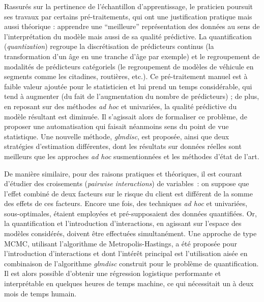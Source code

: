 Rassurés sur la pertinence de l'échantillon d'apprentissage, le praticien poursuit ses travaux par certains pré-traitements, qui ont une justification pratique mais aussi théorique : apprendre une ``meilleure'' représentation des données au sens de l'interprétation du modèle mais aussi de sa qualité prédictive. La quantification (\textit{quantization}) regroupe la discrétisation de prédicteurs continus (la transformation d'un âge en une tranche d'âge par exemple) et le regroupement de modalités de prédicteurs catégoriels (le regroupement de modèles de véhicule en segments comme les citadines, routières, etc.). Ce pré-traitement manuel est à faible valeur ajoutée pour le statisticien et lui prend un temps considérable, qui tend à augmenter (du fait de l'augmentation du nombre de prédicteurs) ; de plus, en reposant sur des méthodes \textit{ad hoc} et univariées, la qualité prédictive du modèle résultant est diminuée. Il s'agissait alors de formaliser ce problème, de proposer une automatisation qui faisait néanmoins sens du point de vue statistique. Une nouvelle méthode, \textit{glmdisc}, est proposée, ainsi que deux stratégies d'estimation différentes, dont les résultats sur données réelles sont meilleurs que les approches \textit{ad hoc} susmentionnées et les méthodes d'état de l'art.

\medskip

De manière similaire, pour des raisons pratiques et théoriques, il est courant d'étudier des croisements (\textit{pairwise interactions}) de variables~: on suppose que l'effet combiné de deux facteurs sur le risque du client est différent de la somme des effets de ces facteurs. Encore une fois, des techniques \textit{ad hoc} et univariées, sous-optimales, étaient employées et pré-supposaient des données quantifiées. Or, la quantification et l'introduction d'interactions, en agissant sur l'espace des modèles considérés, doivent être effectuées simultanément. Une approche de type MCMC, utilisant l'algorithme de Metropolis-Hastings, a été proposée pour l'introduction d'interactions et dont l'intérêt principal est l'utilisation aisée en combinaison de l'algorithme \textit{glmdisc} construit pour le problème de quantification. Il est alors possible d'obtenir une régression logistique performante et interprétable en quelques heures de temps machine, ce qui nécessitait un à deux mois de temps humain.

\medskip

